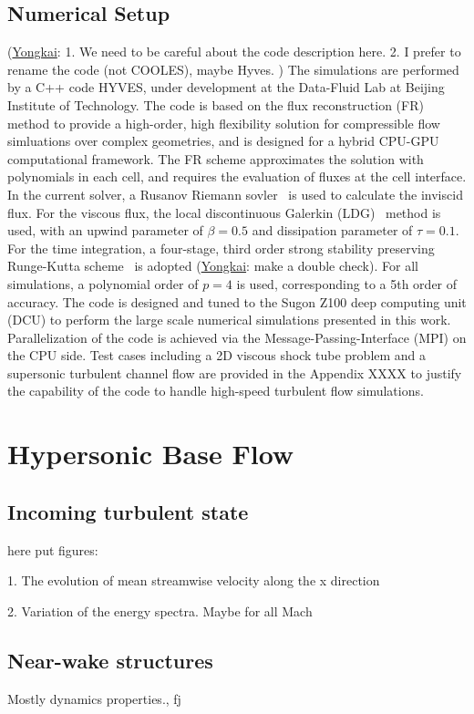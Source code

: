 \documentclass[lineno]{jfm}
\newcommand{\Yongkai}[1]{{\color{red} (\underline{Yongkai}: #1)}}
\begin{document}
\subsection{Numerical Setup}
\Yongkai{1. We need to be careful about the code description here. 2. I prefer to rename the code (not COOLES), maybe Hyves.  }  
The simulations are performed by a C++ code HYVES, under development at the Data-Fluid Lab at Beijing Institute of Technology. The code is based on the flux reconstruction (FR)~\citep{huynh2007flux} method to provide a high-order, high flexibility solution for compressible flow simluations over complex geometries, and is designed for a hybrid CPU-GPU computational framework. The FR scheme approximates the solution with polynomials in each cell, and requires the evaluation of fluxes at the cell interface. In the current solver, a Rusanov Riemann sovler~\citep{rusanov1962calculation} is used to calculate the inviscid flux. For the viscous flux, the local discontinuous Galerkin (LDG)~\citep{cockburn1998local} method is used, with an upwind parameter of $\beta = 0.5$ and dissipation parameter of $\tau = 0.1$. For the time integration, a four-stage, third order strong stability preserving Runge-Kutta scheme~\citep{gottlieb2005} is adopted\Yongkai{make a double check}. For all simulations, a polynomial order of $p=4$ is used, corresponding to a 5th order of accuracy. The code is designed and tuned to the Sugon Z100 deep computing unit (DCU) to perform the large scale numerical simulations presented in this work. Parallelization of the code is achieved via the Message-Passing-Interface (MPI) on the CPU side. Test cases including a 2D viscous shock tube problem and a supersonic turbulent channel flow are provided in the Appendix XXXX to justify the capability of the code to handle high-speed turbulent flow simulations.

\section{Hypersonic Base Flow}
\subsection{Incoming turbulent state}
here put figures: 

1. The evolution of mean streamwise velocity along the x direction


2. Variation of the energy spectra. Maybe for all Mach

\subsection{Near-wake structures}
Mostly dynamics properties., fj
\end{document}
